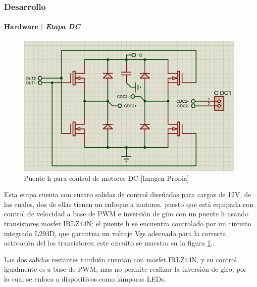 \begin{frame}
\frametitle{Desarrollo}
\framesubtitle{Hardware | \emph{Etapa DC}}
\footnotesize 
\begin{figure}
	\centering
	\caption{\scriptsize Puente h para control de motores DC [Imagen Propia]}
	\label{fig:CDC}
	\includegraphics[width=0.8\linewidth]{Imagenes/CDC}
\end{figure}
		Esta etapa cuenta con cuatro salidas de control diseñadas para cargas de 12V, de las cuales, dos de ellas tienen un enfoque a motores, puesto que está equipada con control de velocidad a base de PWM e inversión de giro con un puente h usando transistores mosfet IRLZ44N; el puente h se encuentra controlado por un circuito integrado L293D, que garantiza un voltaje Vgs adecuado para la correcta activación del los transistores; este circuito se muestra en la figura \ref{fig:CDC}.\cite{IRL}.\newline
		
		Las dos salidas restantes también cuentan con mosfet IRLZ44N, y su control igualmente es a base de PWM, mas no permite realizar la inversión de giro, por lo cual se enfoca a dispositivos como lámparas LEDs.\\
	
\end{frame}

